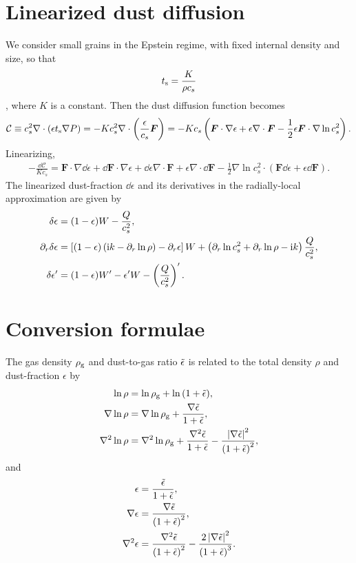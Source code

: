 \section{Linearized dust diffusion}
We consider small grains in the Epstein regime, with fixed internal
density and size, so that
\begin{align}
  t_\mathrm{s}  =  \frac{K}{\rho c_s}
\end{align}
\citep{price15}, where $K$ is a constant. Then the dust diffusion
function becomes
\begin{align}
  \mathcal{C} \equiv c_s^2\nabla\cdot\left(\epsilon t_\mathrm{s}\nabla
  P\right) = - K c_s^2 \nabla\cdot
  \left(\frac{\epsilon}{c_s}\bm{F}\right) =
  -Kc_s \left(\bm{F}\cdot\nabla\epsilon + \epsilon \nabla\cdot\bm{F}
  - \frac{1}{2}\epsilon\bm{F}\cdot\nabla\ln{c_s^2}\right).  
\end{align}
Linearizing,
\begin{align}
  - \frac{\dd\mathcal{C}}{Kc_s} = \bm{F}\cdot\nabla\dd\epsilon +
  \dd\bm{F}\cdot\nabla\epsilon + \dd\epsilon\nabla\cdot\bm{F} +
  \epsilon\nabla\cdot\dd\bm{F} -
  \frac{1}{2}\nabla\ln{c_s^2}\cdot\left(\bm{F}\dd\epsilon + \epsilon
  \dd\bm{F}\right). 
\end{align}
The linearized dust-fraction $\dd\epsilon$ and its derivatives in the
radially-local approximation are given by
\begin{align}
  \delta\epsilon      &= (1-\epsilon)W - \frac{Q}{c_s^2}, \\
  \partial_r\delta\epsilon &= \left[(1-\epsilon)\left(\mathrm{i} k -
    \partial_r\ln{\rho}\right) - \partial_r\epsilon\right]W + \left(\partial_r\ln{c_s^2}
  + \partial_r\ln{\rho} - \mathrm{i} k \right)\frac{Q}{c_s^2},\\
  \delta\epsilon^\prime &= (1-\epsilon)W^\prime - \epsilon^\prime W -
  \left(\frac{Q}{c_s^2}\right)^\prime. 
\end{align}



\section{Conversion formulae}
The gas density $\rho_\mathrm{g}$ and dust-to-gas ratio $\tilde{\epsilon}$ is related
to the total density $\rho$ and dust-fraction $\epsilon$ by
\begin{align}
  \ln{\rho} &= \ln{\rho_\mathrm{g}} + \ln{\left(1 + \tilde{\epsilon}\right)},\\
  \nabla\ln{\rho} &= \nabla\ln{\rho_\mathrm{g}} + \frac{\nabla\tilde{\epsilon}}{1+
    \tilde{\epsilon}},\\
  \nabla^2\ln{\rho} &= \nabla^2\ln{\rho_\mathrm{g}} +
  \frac{\nabla^2\tilde{\epsilon}}{1+\tilde{\epsilon}} -
  \frac{\left|\nabla\tilde{\epsilon}\right|^2}{\left(1+\tilde{\epsilon}\right)^2}, 
\end{align}
and
\begin{align}
  \epsilon &= \frac{\tilde{\epsilon}}{1+ \tilde{\epsilon}},\\
 \nabla\epsilon & =
 \frac{\nabla\tilde{\epsilon}}{\left(1+\tilde{\epsilon}\right)^2},\\
 \nabla^2\epsilon &=
 \frac{\nabla^2\tilde{\epsilon}}{\left(1+\tilde{\epsilon}\right)^2} -
 \frac{2\left|\nabla\tilde{\epsilon}\right|^2}{\left(1+\tilde{\epsilon}\right)^3}. 
\end{align}
